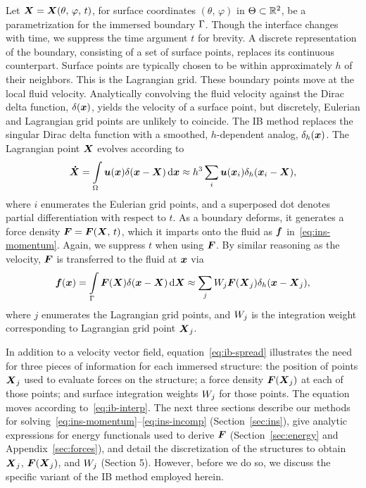 Let $\boldsymbol{X} = \boldsymbol{X}(\theta,\,\varphi,\,t)$, for surface coordinates $(\theta,\,\varphi)$ in
$\Theta\subset\mathbb{R}^2$, be a parametrization for the immersed boundary $\Gamma$.
Though the interface changes with time, we suppress the time argument $t$ for brevity. A
discrete representation of the boundary, consisting of a set of surface points, replaces
its continuous counterpart.  Surface points are typically chosen to be within
approximately $h$ of their neighbors.  This is the Lagrangian grid. These boundary points
move at the local fluid velocity.  Analytically convolving the fluid velocity against the
Dirac delta function, $\delta(\boldsymbol{x})$, yields the velocity of a surface point, but
discretely, Eulerian and Lagrangian grid points are unlikely to coincide. The IB method
replaces the singular Dirac delta function with a smoothed, $h$-dependent analog,
$\delta_h(\boldsymbol{x})$. The Lagrangian point $\boldsymbol{X}$ evolves according to
\begin{equation}\label{eq:ib-interp}
    \vec{\dot{X}}
        = \int\limits_{\domain} \u(\x) \Dirac(\x-\X) \d\x
        \approx h^3 \sum_{i} \u(\x_i) \Dirac_h(\x_i-\X),
\end{equation}
where $i$ enumerates the Eulerian grid points, and a superposed dot denotes partial
differentiation with respect to $t$. As a boundary deforms, it generates a force density
$\boldsymbol{F} = \boldsymbol{F}(\boldsymbol{X},\,t)$, which it imparts onto the fluid as $\boldsymbol{f}$ in~\eqref{eq:ins-momentum}.
Again, we suppress $t$ when using $\boldsymbol{F}$. By similar reasoning as the velocity, $\boldsymbol{F}$ is
transferred to the fluid at $\boldsymbol{x}$ via
\begin{equation}\label{eq:ib-spread}
        \f(\x)
        = \int\limits_{\interface} \F(\X)\Dirac(\x-\X) \d\X
        \approx \sum_{j} \weight[j]\F(\X_j) \Dirac_h(\x-\X_j),
\end{equation}
where $j$ enumerates the Lagrangian grid points, and $\weight[j]$ is the integration
weight corresponding to Lagrangian grid point $\boldsymbol{X}_j$. 

In addition to a velocity vector field, equation~\eqref{eq:ib-spread} illustrates the
need for three pieces of information for each immersed structure: the position of points
$\boldsymbol{X}_j$ used to evaluate forces on the structure; a force density $\boldsymbol{F}(\boldsymbol{X}_j)$ at each of
those points; and surface integration weights $\weight[j]$ for those points. The equation
moves according to~\eqref{eq:ib-interp}. The next three sections describe our methods for
solving~\eqref{eq:ins-momentum}--\eqref{eq:ins-incomp} (Section~\ref{sec:ins}), give
analytic expressions for energy functionals used to derive $\boldsymbol{F}$ (Section~\ref{sec:energy}
and Appendix~\ref{sec:forces}), and detail the discretization of the structures to obtain
$\boldsymbol{X}_j$, $\boldsymbol{F}(\boldsymbol{X}_j)$, and $\weight[j]$ (Section 5). However, before we do so, we discuss
the specific variant of the IB method employed herein.

